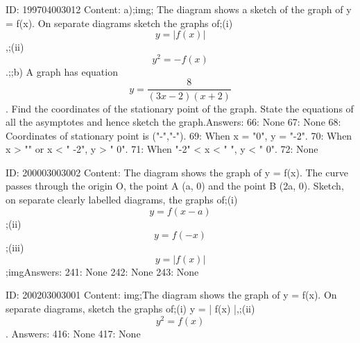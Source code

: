 \documentclass{article}
\begin{document}
ID: 199704003012
Content:
a);img; The diagram shows a sketch of the graph of y = f(x). On separate diagrams sketch the graphs of;(i) \[y = |f(x)|\],;(ii) \[y^{2} = -f(x)\].;;b) A graph has equation \[y = \frac {8}{(3x - 2)(x + 2)}\]. Find the coordinates of the stationary point of the graph. State the equations of all the asymptotes and hence sketch the graph.Answers:
66: None
67: None
68: Coordinates of stationary point is ("-","-").
69: When x = "0", y = "-2".
70: When x > "" or x < " -2", y > " 0".
71: When "-2" < x < " ", y < " 0".
72: None

ID: 200003003002
Content:
The diagram shows the graph of y = f(x). The curve passes through the origin O, the point A (a, 0) and the point B (2a, 0). Sketch, on separate clearly labelled diagrams, the graphs of;(i) $$y = f(x-a)$$;(ii) $$y = f(-x)$$;(iii) $$y = |f(x)|$$;imgAnswers:
241: None
242: None
243: None

ID: 200203003001
Content:
img;The diagram shows the graph of y = f(x). On separate diagrams, sketch the graphs of;(i) y = | f(x) |,;(ii)  $$y^2  = f( x )$$. Answers:
416: None
417: None
\end{document}
